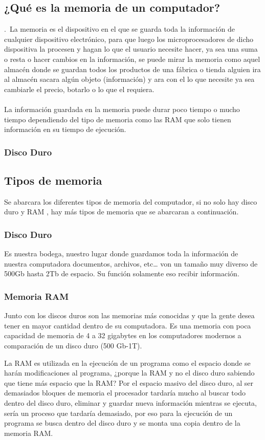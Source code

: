 \documentclass{article}
\begin{document}
\subsection{¿Qué es la memoria de un computador?}
 .\
	La memoria es el dispositivo en el que se guarda toda la información de cualquier dispositivo electrónico, para que luego los microprocesadores de dicho dispositiva la procesen y hagan lo que el usuario necesite hacer, ya sea una suma o resta o hacer cambios en la información, se puede mirar la memoria como aquel almacén donde se guardan todos los productos de una fábrica o tienda alguien ira al almacén sacara algún objeto (información) y ara con el lo que necesite ya sea cambiarle el precio, botarlo o lo que el requiera.
	\\\\
La información guardada en la memoria puede durar poco tiempo o mucho tiempo dependiendo del tipo de memoria como las RAM que solo  tienen información en su tiempo de ejecución.

\subsubsection{Disco Duro}
\subsection{Tipos de memoria}
Se abarcara los diferentes tipos de memoria del computador, si no solo hay disco duro y RAM , hay más tipos de memoria que se abarcaran a continuación. 
\subsubsection{Disco Duro}
Es nuestra bodega, nuestro lugar donde guardamos toda la información de nuestra computadora documentos, archivos, etc… von un tamaño muy diverso de 500Gb hasta 2Tb de espacio.
Su función solamente eso recibir información.

\subsubsection{Memoria RAM}
Junto con los discos duros son las memorias más conocidas y que la gente desea tener en mayor cantidad dentro de su computadora. Es una memoria con poca capacidad de memoria de 4 a 32 gigabytes en los computadores modernos a comparación de un disco duro (500 Gb-1T).
\vspace{10pt}

La RAM es utilizada en la ejecución de un programa como el espacio donde se harán modificaciones al programa, ¿porque la RAM y no el disco duro sabiendo que tiene más espacio que la RAM? Por el espacio masivo del disco duro, al ser demasiados bloques de memoria el procesador tardaría mucho al buscar todo dentro del disco duro, eliminar y guardar nueva información mientras se ejecuta, sería un proceso que tardaría demasiado, por eso para la ejecución de un programa se busca dentro del disco duro y se monta una copia dentro de la memoria RAM.
\vspace{10pt}
\end{document}
